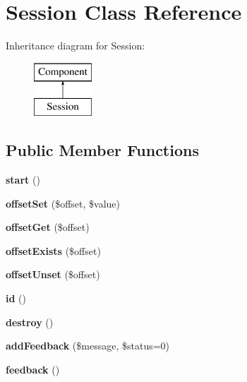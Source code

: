 \hypertarget{classSession}{
\section{Session Class Reference}
\label{classSession}
}
Inheritance diagram for Session:\begin{figure}[H]
\begin{center}
\leavevmode
\includegraphics[height=2.000000cm]{classSession}
\end{center}
\end{figure}
\subsection*{Public Member Functions}
\begin{DoxyCompactItemize}
\item 
\hypertarget{classSession_a91bc789717d481ad5b4092fc7de9520c}{
{\bfseries start} ()}
\label{classSession_a91bc789717d481ad5b4092fc7de9520c}

\item 
\hypertarget{classSession_a71c2094d14dec32f7316332ce828ce9c}{
{\bfseries offsetSet} (\$offset, \$value)}
\label{classSession_a71c2094d14dec32f7316332ce828ce9c}

\item 
\hypertarget{classSession_add0611fb94dae2ef4f0c4ee42724a249}{
{\bfseries offsetGet} (\$offset)}
\label{classSession_add0611fb94dae2ef4f0c4ee42724a249}

\item 
\hypertarget{classSession_a984150b4571fcbe8501d3a980d49877a}{
{\bfseries offsetExists} (\$offset)}
\label{classSession_a984150b4571fcbe8501d3a980d49877a}

\item 
\hypertarget{classSession_a2f91fbb41ea4643fb6c83a64f2cfdc74}{
{\bfseries offsetUnset} (\$offset)}
\label{classSession_a2f91fbb41ea4643fb6c83a64f2cfdc74}

\item 
\hypertarget{classSession_a14e1fad994edf0ac73d617774c69dcfa}{
{\bfseries id} ()}
\label{classSession_a14e1fad994edf0ac73d617774c69dcfa}

\item 
\hypertarget{classSession_aaaeaf924cc8f951ae2adf7e182604b3f}{
{\bfseries destroy} ()}
\label{classSession_aaaeaf924cc8f951ae2adf7e182604b3f}

\item 
\hypertarget{classSession_a25b59d4868b28f083630a3d753c11f84}{
{\bfseries addFeedback} (\$message, \$status=0)}
\label{classSession_a25b59d4868b28f083630a3d753c11f84}

\item 
\hypertarget{classSession_ab71f5250f5f910d169ed61643d38fd2c}{
{\bfseries feedback} ()}
\label{classSession_ab71f5250f5f910d169ed61643d38fd2c}

\end{DoxyCompactItemize}
